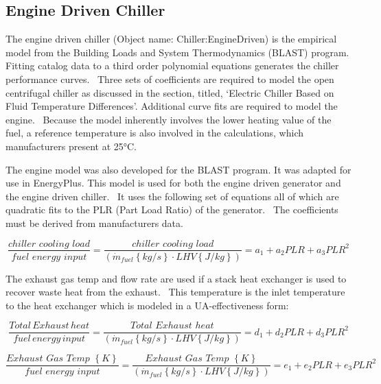 \subsection{Engine Driven Chiller}\label{engine-driven-chiller}

The engine driven chiller (Object name: Chiller:EngineDriven) is the empirical model from the Building Loads and System Thermodynamics (BLAST) program. Fitting catalog data to a third order polynomial equations generates the chiller performance curves.~ Three sets of coefficients are required to model the open centrifugal chiller as discussed in the section, titled, `Electric Chiller Based on Fluid Temperature Differences'. Additional curve fits are required to model the engine.~ Because the model inherently involves the lower heating value of the fuel, a reference temperature is also involved in the calculations, which manufacturers present at 25°C.

The engine model was also developed for the BLAST program. It was adapted for use in EnergyPlus. This model is used for both the engine driven generator and the engine driven chiller.~ It uses the following set of equations all of which are quadratic fits to the PLR (Part Load Ratio) of the generator.~ The coefficients must be derived from manufacturers data.

\begin{equation}
\frac{{chiller\,\,cooling\,\,load}}{{fuel\,\,energy\,\,input}} = \frac{{chiller\,\,cooling\,\,load}}{{\left( {{{\dot m}_{fuel}}\left\{ {kg/s} \right\} \cdot LHV\left\{ {J/kg} \right\}} \right)}} = {a_1} + {a_2}PLR + {a_3}PL{R^2}
\end{equation}

The exhaust gas temp and flow rate are used if a stack heat exchanger is used to recover waste heat from the exhaust.~ This temperature is the inlet temperature to the heat exchanger which is modeled in a UA-effectiveness form:

\begin{equation}
\frac{{Total\,Exhaust\,heat}}{{fuel\,energy\,input}} = \frac{{Total\,\,Exhaust\,\,heat}}{{\left( {{{\dot m}_{fuel}}\left\{ {kg/s} \right\} \cdot LHV\left\{ {J/kg} \right\}} \right)}} = {d_1} + {d_2}PLR + {d_3}PL{R^2}
\end{equation}

\begin{equation}
\frac{{Exhaust\,\,Gas\,\,Temp\,\,\left\{ K \right\}}}{{fuel\,\,energy\,\,input}} = \frac{{Exhaust\,\,Gas\,\,Temp\,\,\left\{ K \right\}}}{{\left( {{{\dot m}_{fuel}}\left\{ {kg/s} \right\} \cdot LHV\left\{ {J/kg} \right\}} \right)}} = {e_1} + {e_2}PLR + {e_3}PL{R^2}
\end{equation}

